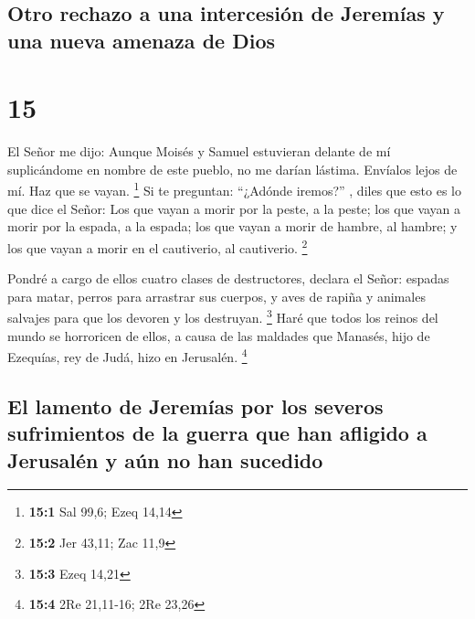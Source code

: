 \hypertarget{otro-rechazo-a-una-intercesiuxf3n-de-jeremuxedas-y-una-nueva-amenaza-de-dios}{%
\subsection{Otro rechazo a una intercesión de Jeremías y una nueva
amenaza de
Dios}\label{otro-rechazo-a-una-intercesiuxf3n-de-jeremuxedas-y-una-nueva-amenaza-de-dios}}

\hypertarget{section-14}{%
\section{15}\label{section-14}}

 El Señor me dijo: Aunque Moisés y Samuel estuvieran
delante de mí suplicándome en nombre de este pueblo, no me darían
lástima. Envíalos lejos de mí. Haz que se vayan. \footnote{\textbf{15:1}
  Sal 99,6; Ezeq 14,14}  Si te preguntan: ``¿Adónde
iremos?'' , diles que esto es lo que dice el Señor: Los que vayan a
morir por la peste, a la peste; los que vayan a morir por la espada, a
la espada; los que vayan a morir de hambre, al hambre; y los que vayan a
morir en el cautiverio, al cautiverio. \footnote{\textbf{15:2} Jer
  43,11; Zac 11,9}

 Pondré a cargo de ellos cuatro clases de destructores,
declara el Señor: espadas para matar, perros para arrastrar sus cuerpos,
y aves de rapiña y animales salvajes para que los devoren y los
destruyan. \footnote{\textbf{15:3} Ezeq 14,21}  Haré que
todos los reinos del mundo se horroricen de ellos, a causa de las
maldades que Manasés, hijo de Ezequías, rey de Judá, hizo en Jerusalén.
\footnote{\textbf{15:4} 2Re 21,11-16; 2Re 23,26}

\hypertarget{el-lamento-de-jeremuxedas-por-los-severos-sufrimientos-de-la-guerra-que-han-afligido-a-jerusaluxe9n-y-auxfan-no-han-sucedido}{%
\subsection{El lamento de Jeremías por los severos sufrimientos de la
guerra que han afligido a Jerusalén y aún no han
sucedido}\label{el-lamento-de-jeremuxedas-por-los-severos-sufrimientos-de-la-guerra-que-han-afligido-a-jerusaluxe9n-y-auxfan-no-han-sucedido}}

